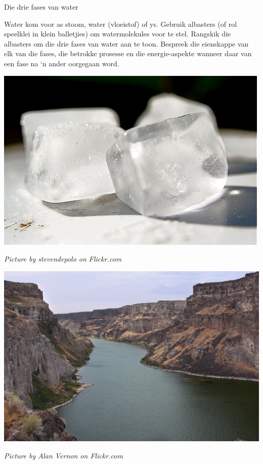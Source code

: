\begin{activity}{Die drie fases van water}
\begin{minipage}{0.5\textwidth}
Water kom voor as stoom, water (vloeistof) of ys. Gebruik albasters (of rol speelklei in klein balletjies) om watermolekules voor te stel. Rangskik die albasters om die drie fases van water aan te toon. Bespreek die eienskappe van elk van die fases, die betrokke prosesse en die energie-aspekte wanneer daar van een fase na ‘n ander oorgegaan word.
\end{minipage}
\begin{minipage}{.5\textwidth}
\begin{center}
 \includegraphics[width=.3\textwidth]{photos/iceby-stevendepolo-flickr.jpg}\par
\textit{Picture by stevendepolo on Flickr.com}
\end{center}
\begin{center}
 \includegraphics[width=.3\textwidth]{photos/AlanVernon.jpg}\par
\textit{Picture by Alan Vernon on Flickr.com}
\end{center}
\end{minipage}
\end{activity}

      
\label{m38730*cid7}
